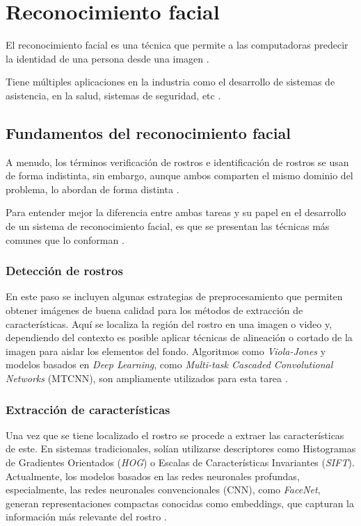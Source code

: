 
\section{Reconocimiento facial}

El reconocimiento facial es una técnica que permite a las computadoras predecir la identidad de una persona desde una imagen \cite{L14}.

Tiene múltiples aplicaciones en la industria como el desarrollo de sistemas de asistencia, en la salud, sistemas de seguridad, etc \cite{L15}. 

\subsection{Fundamentos del reconocimiento facial}

A menudo, los términos verificación de rostros e identificación de rostros se usan de forma indistinta, sin embargo, aunque ambos comparten el mismo dominio del problema, lo abordan de forma distinta \cite{L16}.

Para entender mejor la diferencia entre ambas tareas y su papel en el desarrollo de un sistema de reconocimiento facial, es que se presentan las técnicas más comunes que lo conforman \cite{L15}.

\subsubsection{Detección de rostros}

En este paso se incluyen algunas estrategias de preprocesamiento que permiten obtener imágenes de buena calidad para los métodos de extracción de características.
Aquí se localiza la región del rostro en una imagen o video y, dependiendo del contexto es posible aplicar técnicas de alineación o cortado de la imagen para aislar los elementos del fondo. Algoritmos como \textit{Viola-Jones} y modelos basados en \textit{Deep Learning}, como \textit{Multi-task Cascaded Convolutional Networks} (MTCNN), son ampliamente utilizados para esta tarea \cite{L16}. 

\subsubsection{Extracción de características}

Una vez que se tiene localizado el rostro se procede a extraer las características de este. En sistemas tradicionales, solían utilizarse descriptores como Histogramas de Gradientes Orientados (\textit{HOG}) o Escalas de Características Invariantes (\textit{SIFT}). Actualmente, los modelos basados en las redes neuronales profundas, especialmente, las redes neuronales convencionales (CNN), como \textit{FaceNet}, generan representaciones compactas conocidas como embeddings, que capturan la información más relevante del rostro \cite{L14}.

